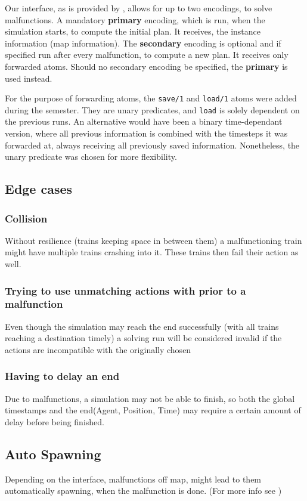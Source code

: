 Our interface, as is provided by \cite{flatland}, allows for up to two encodings, to solve malfunctions. A mandatory \textbf{primary} encoding, which is run, when the simulation starts, to compute the initial plan. It receives, the instance information (map information). The \textbf{secondary} encoding is optional and if specified run after every malfunction, to compute a new plan. It receives only forwarded atoms. Should no secondary encoding be specified, the \textbf{primary} is used instead.

For the purpose of forwarding atoms, the \texttt{save/1} and \texttt{load/1} atoms were added during the semester\cite{malfunction_branch}. They are unary predicates, and \texttt{load} is solely dependent on the previous runs. An alternative would have been a binary time-dependant version, where all previous information is combined with the timesteps it was forwarded at, always receiving all previously saved information. Nonetheless, the unary predicate was chosen for more flexibility.

\subsection{Edge cases}

\subsubsection {Collision} Without resilience (trains keeping space in between them) a malfunctioning train might have multiple trains crashing into it. These trains then fail their action as well.

\subsubsection {Trying to use unmatching actions with prior to a malfunction} Even though the simulation may reach the end successfully (with all trains reaching a destination timely) a solving run will be considered invalid if the actions are incompatible with the originally chosen

\subsubsection {Having to delay an end} Due to malfunctions, a simulation may not be able to finish, so both the global timestamps and the end(Agent, Position, Time) may require a certain amount of delay before being finished.

\subsection {Auto Spawning} Depending on the interface, malfunctions off map, might lead to them automatically spawning, when the malfunction is done. (For more info see \cite{malfunction_issue})

